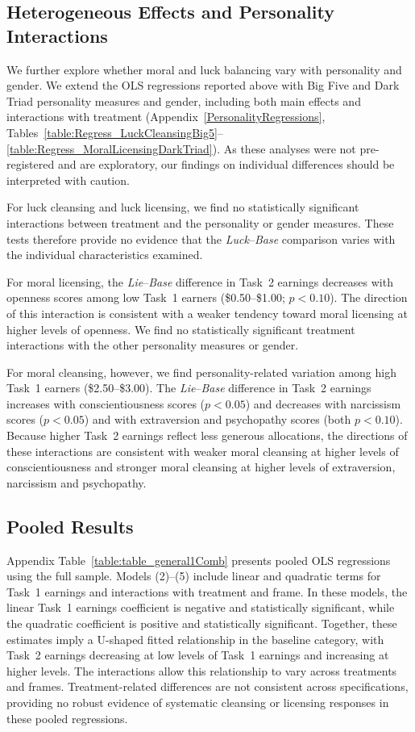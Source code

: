 \documentclass{article}
\begin{document}
\subsection*{Heterogeneous Effects and Personality Interactions}
We further explore whether moral and luck balancing vary with personality and gender. We extend the OLS regressions reported above with Big Five and Dark Triad personality measures and gender, including both main effects and interactions with treatment (Appendix~\ref{PersonalityRegressions}, Tables~\ref{table:Regress_LuckCleansingBig5}--\ref{table:Regress_MoralLicensingDarkTriad}). As these analyses were not pre-registered and are exploratory, our findings on individual differences should be interpreted with caution.
\par 
For luck cleansing and luck licensing, we find no statistically significant interactions between treatment and the personality or gender measures. These tests therefore provide no evidence that the \textit{Luck}--\textit{Base} comparison varies with the individual characteristics examined.
\par 
For moral licensing, the \textit{Lie}--\textit{Base} difference in Task~2 earnings decreases with openness scores among low Task~1 earners (\$0.50--\$1.00; $p < 0.10$). The direction of this interaction is consistent with a weaker tendency toward moral licensing at higher levels of openness. We find no statistically significant treatment interactions with the other personality measures or gender.
\par
For moral cleansing, however, we find personality-related variation among high Task~1 earners (\$2.50--\$3.00). The \textit{Lie}--\textit{Base} difference in Task~2 earnings increases with conscientiousness scores ($p < 0.05$) and decreases with narcissism scores ($p < 0.05$) and with extraversion and psychopathy scores (both $p < 0.10$). Because higher Task~2 earnings reflect less generous allocations, the directions of these interactions are consistent with weaker moral cleansing at higher levels of conscientiousness and stronger moral cleansing at higher levels of extraversion, narcissism and psychopathy.

\subsection*{Pooled Results}
Appendix Table~\ref{table:table_general1Comb} presents pooled OLS regressions using the full sample. Models (2)--(5) include linear and quadratic terms for Task~1 earnings and interactions with treatment and frame. In these models, the linear Task~1 earnings coefficient is negative and statistically significant, while the quadratic coefficient is positive and statistically significant. Together, these estimates imply a U-shaped fitted relationship in the baseline category, with Task~2 earnings decreasing at low levels of Task~1 earnings and increasing at higher levels. The interactions allow this relationship to vary across treatments and frames. Treatment-related differences are not consistent across specifications, providing no robust evidence of systematic cleansing or licensing responses in these pooled regressions.
\end{document}
